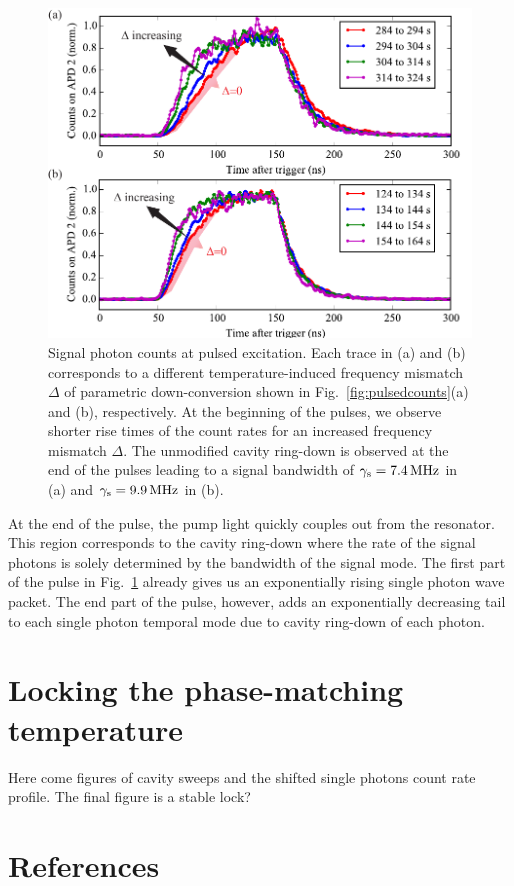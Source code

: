 \documentclass[aps,pra,showpacs,reprint,onecolumn,notitlepage]{revtex4-1}
\newcommand{\tx}[1]{\textnormal{#1}}
\begin{document}
\begin{figure}[htb]
	\centering
	\includegraphics[scale=0.8]{pictures/exp_WGMR_detuning/SPDC_detuning_pulses_1.pdf} 
	\caption{Signal photon counts at pulsed excitation. Each trace in (a) and (b) corresponds to a different temperature-induced frequency mismatch $\Delta$ of parametric down-conversion shown in Fig.~\ref{fig:pulsedcounts}(a) and (b), respectively. At the beginning of the pulses, we observe shorter rise times of the count rates for an increased frequency mismatch $\Delta$. The unmodified cavity ring-down is observed at the end of the pulses leading to a signal bandwidth of ${\gamma_\tx{s}=\SI{7.4}{\MHz}}$ in (a) and ${\gamma_\tx{s}=\SI{9.9}{\MHz}}$ in (b).}
	\label{fig:pulsedcountsnano}
\end{figure}

At the end of the pulse, the pump light quickly couples out from the resonator. This region corresponds to the cavity ring-down where the rate of the signal photons is solely determined by the bandwidth of the signal mode. The first part of the pulse in Fig.~\ref{fig:pulsedcountsnano} already gives us an exponentially rising single photon wave packet. The end part of the pulse, however, adds an exponentially decreasing tail to each single photon temporal mode due to cavity ring-down of each photon.

\section{Locking the phase-matching temperature}
Here come figures of cavity sweeps and the shifted single photons count rate profile. The final figure is a stable lock?

\section{References}
	
	
%	

%
\end{document}
